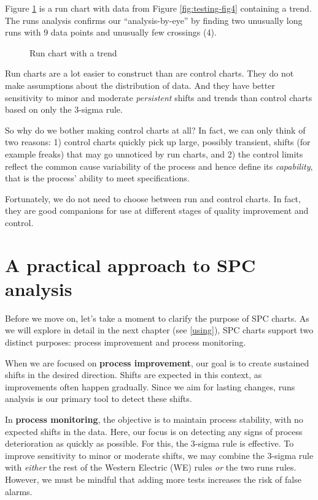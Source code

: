 \documentclass[
]{book}
\makeatletter
\newcommand*\pandocbounded[1]{%
  \sbox\pandoc@box{#1}%
  \Gscale@div\@tempa{\textheight}{\dimexpr\ht\pandoc@box+\dp\pandoc@box\relax}%
  \Gscale@div\@tempb{\linewidth}{\wd\pandoc@box}%
  \ifdim\@tempb\p@<\@tempa\p@\let\@tempa\@tempb\fi%
  \ifdim\@tempa\p@<\p@\scalebox{\@tempa}{\usebox\pandoc@box}%
  \else\usebox{\pandoc@box}%
  \fi%
}
\makeatother
\begin{document}
Figure \ref{fig:testing-fig6} is a run chart with data from Figure \ref{fig:testing-fig4} containing a trend. The runs analysis confirms our ``analysis-by-eye'' by finding two unusually long runs with 9 data points and unusually few crossings (4).

\begin{figure}
\centering
\pandocbounded{}
\caption{\label{fig:testing-fig6}Run chart with a trend}
\end{figure}

Run charts are a lot easier to construct than are control charts. They do not make assumptions about the distribution of data. And they have better sensitivity to minor and moderate \emph{persistent} shifts and trends than control charts based on only the 3-sigma rule.

So why do we bother making control charts at all? In fact, we can only think of two reasons: 1) control charts quickly pick up large, possibly transient, shifts (for example freaks) that may go unnoticed by run charts, and 2) the control limits reflect the common cause variability of the process and hence define its \emph{capability}, that is the process' ability to meet specifications.

Fortunately, we do not need to choose between run and control charts. In fact, they are good companions for use at different stages of quality improvement and control.

\section{A practical approach to SPC analysis}\label{a-practical-approach-to-spc-analysis}

Before we move on, let's take a moment to clarify the purpose of SPC charts. As we will explore in detail in the next chapter (see \ref{using}), SPC charts support two distinct purposes: process improvement and process monitoring.

When we are focused on \textbf{process improvement}, our goal is to create sustained shifts in the desired direction. Shifts are expected in this context, as improvements often happen gradually. Since we aim for lasting changes, runs analysis is our primary tool to detect these shifts.

In \textbf{process monitoring}, the objective is to maintain process stability, with no expected shifts in the data. Here, our focus is on detecting any signs of process deterioration as quickly as possible. For this, the 3-sigma rule is effective. To improve sensitivity to minor or moderate shifts, we may combine the 3-sigma rule with \emph{either} the rest of the Western Electric (WE) rules \emph{or} the two runs rules. However, we must be mindful that adding more tests increases the risk of false alarms.
\end{document}
